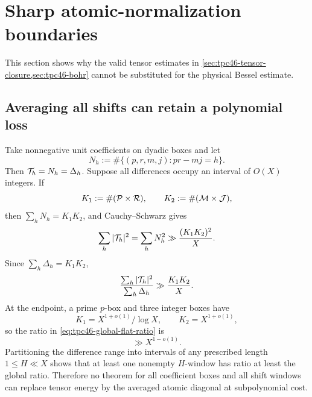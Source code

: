 \section{Sharp atomic-normalization boundaries}
\label{sec:tpc46-atomic-boundaries}

This section shows why the valid tensor estimates in
\cref{sec:tpc46-tensor-closure,sec:tpc46-bohr} cannot be substituted for
the physical Bessel estimate.

\subsection{Averaging all shifts can retain a polynomial loss}

Take nonnegative unit coefficients on dyadic boxes and let
\begin{equation}
 N_h:=\#\{(p,r,m,j):pr-mj=h\}.
 \label{eq:tpc46-flat-count}
\end{equation}
Then \(\mathcal T_h=N_h=\Delta_h\).  Suppose all differences occupy an
interval of \(O(X)\) integers.  If
\begin{equation}
 K_1:=\#(\mathcal P\times\mathcal R),
 \qquad
 K_2:=\#(\mathcal M\times\mathcal J),
 \label{eq:tpc46-flat-cardinalities}
\end{equation}
then \(\sum_hN_h=K_1K_2\), and Cauchy--Schwarz gives
\begin{equation}
 \sum_h|\mathcal T_h|^2
 =\sum_hN_h^2
 \gg\frac{(K_1K_2)^2}{X}.
 \label{eq:tpc46-global-flat-energy}
\end{equation}
Since \(\sum_h\Delta_h=K_1K_2\),
\begin{equation}
 \frac{\sum_h|\mathcal T_h|^2}{\sum_h\Delta_h}
 \gg\frac{K_1K_2}{X}.
 \label{eq:tpc46-global-flat-ratio}
\end{equation}
At the endpoint, a prime \(p\)-box and three integer boxes have
\begin{equation}
 K_1=X^{1+o(1)}/\log X,
 \qquad
 K_2=X^{1+o(1)},
 \label{eq:tpc46-flat-endpoint-counts}
\end{equation}
so the ratio in \eqref{eq:tpc46-global-flat-ratio} is
\begin{equation}
 \gg X^{1-o(1)}.
 \label{eq:tpc46-flat-X-loss}
\end{equation}
Partitioning the difference range into intervals of any prescribed
length \(1\le H\ll X\) shows that at least one nonempty \(H\)-window
has ratio at least the global ratio.  Therefore no theorem for all
coefficient boxes and all shift windows can replace tensor energy by
the averaged atomic diagonal at subpolynomial cost.

